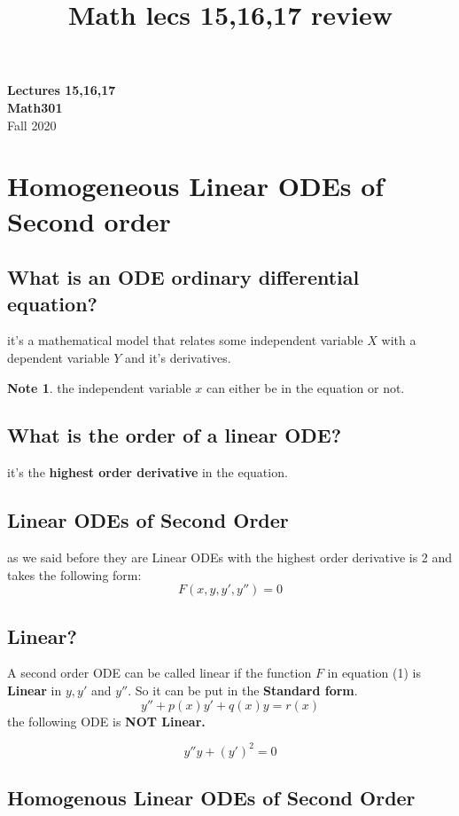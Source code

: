 \documentclass[11pt]{article}
\theoremstyle{definition}
\newtheorem{note}{Note}
\begin{document}
\setcounter{section}{0}
\title{Math lecs 15,16,17 review}

\thispagestyle{empty}
\begin{center}
{\LARGE \bf Lectures 15,16,17}\\[0.3cm]
{\large \bf Math301}\\[0.3cm]
Fall 2020
\end{center}
\tableofcontents
\newpage
\section{Homogeneous Linear ODEs of Second order} 
\subsection{What is an ODE ordinary differential equation?}
it's a mathematical model that relates some independent variable $X$ with a dependent variable $Y$ and it's derivatives.  
\begin{note}
the independent variable $x$ can either be in the equation or not. 
\end{note}
\subsection{What is the order of a linear ODE?}
it's the \textbf{highest order derivative} in the equation. 
\subsection{Linear ODEs of Second Order}
as we said before they are Linear ODEs with the highest order derivative is 2 and takes the following form: 
\begin{equation}
    F(x,y,y',y'')=0
\end{equation}
\subsection{Linear?}
A second order ODE can be called linear if the function $F$ in equation (1) is \textbf{Linear} in $y,y'$ and $y''$. So it can be put in the \textbf{Standard form}.
\begin{equation}
    y''+p(x)y'+q(x)y=r(x)
\end{equation}
the following ODE is \textbf{NOT Linear.}

\begin{equation}
    y''y+(y')^2=0
\end{equation}

\subsection{Homogenous Linear ODEs of Second Order}
\end{document}
